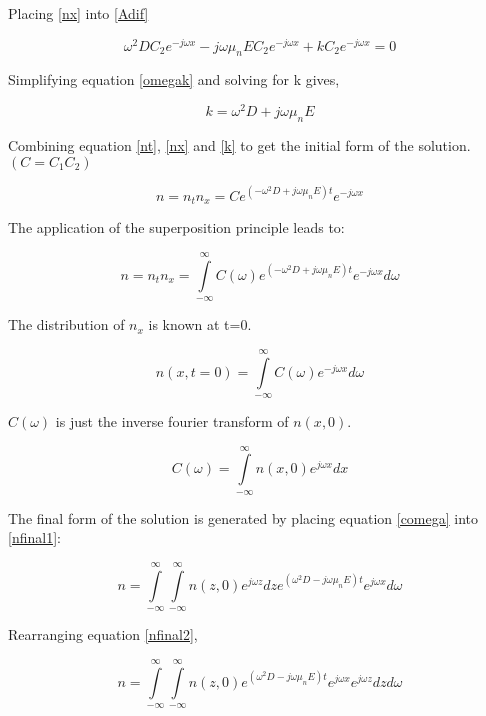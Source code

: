 \begin{doublespace}
Placing \eqref{nx} into \eqref{Adif}

\begin{equation}
\omega^2 D C_2 e^{-j\omega x}-j\omega \mu_n E C_2 e^{-j\omega x}+kC_2e^{-j\omega x}=0
\label{omegak}
\end{equation}

Simplifying equation \eqref{omegak} and solving for k gives,

\begin{equation}
k=\omega^2 D+j\omega \mu_n E
\label{k}
\end{equation}

Combining equation \eqref{nt}, \eqref{nx} and \eqref{k} to get the initial form of the solution. $(C=C_1C_2)$

\begin{equation}
n=n_tn_x=Ce^{(-\omega^2 D + j\omega \mu_n E)t} e^{-j\omega x}
\end{equation}

The application of the superposition principle\cite{DifEq} leads to:

\begin{equation}
n=n_tn_x=\int\limits_{-\infty}^{\infty}C(\omega)e^{(-\omega^2 D + j\omega \mu_n E)t} e^{-j\omega x}d\omega
\label{nfinal1}
\end{equation}

The distribution of $n_x$ is known at t=0.

\begin{equation}
n(x,t=0)=\int\limits_{-\infty}^{\infty}C(\omega) e^{-j\omega x}d\omega
\end{equation}

$C(\omega)$ is just the inverse fourier transform of $n(x,0)$.

\begin{equation}
C(\omega)=\int\limits_{-\infty}^{\infty}n(x,0)e^{j\omega x}dx
\label{comega}
\end{equation}

The final form of the solution is generated by placing equation \eqref{comega} into \eqref{nfinal1}:

\begin{equation}
n=\int\limits_{-\infty}^{\infty}\int\limits_{-\infty}^{\infty}n(z,0)e^{j\omega z}dz e^{(\omega ^2 D-j\omega \mu_n E)t}e^{j\omega x}d\omega
\label{nfinal2}
\end{equation}

Rearranging equation \eqref{nfinal2},

\begin{equation}
n=\int\limits_{-\infty}^{\infty}\int\limits_{-\infty}^{\infty}n(z,0) e^{(\omega ^2 D-j\omega \mu_n E)t}e^{j\omega x} e^{j\omega z}  dz d\omega
\end{equation}


\end{doublespace}
